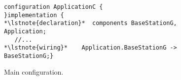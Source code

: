 \begin{figure}[!tb]
\begin{lstlisting}[style=conescframe]
configuration ApplicationC {
}implementation {
*\lstnote{declaration}*  components BaseStationG, Application;
   //...
*\lstnote{wiring}*    Application.BaseStationG -> BaseStationG;}
\end{lstlisting}
\vspace{-4mm}
\caption{Main configuration.}
  \label{fig:mc}
\vspace{-2mm}
\end{figure}
